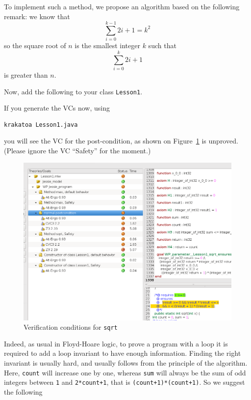 \documentclass[a4paper,11pt,twoside,openright]{report}
\begin{document}
To implement such a method, we propose an algorithm based on the
following remark: we know that
\[
\sum_{i=0}^{k-1} 2i+1 = k^2
\]
so the square root of $n$ is the smallest integer $k$ such that
\[
\sum_{i=0}^{k} 2i+1
\]
is greater than $n$.

Now, add the following to your class \texttt{Lesson1}.

If you generate the VCs now, using
\begin{verbatim}
krakatoa Lesson1.java
\end{verbatim}
you will see the VC for the post-condition, as shown on
Figure~\ref{fig:sqrt} is unproved. (Please ignore the VC ``Safety''
for the moment.)

\begin{figure}[t]
  \begin{center}
    \includegraphics[width=\textwidth]{Lesson1_isqrt_why3_1.png}
  \end{center}
  \caption{Verification conditions for \texttt{sqrt}}
\label{fig:sqrt}
\hrulefill
\end{figure}


Indeed, as usual in Floyd-Hoare logic, to prove a program with a loop
it is required to add a loop invariant to have enough
information.
Finding the right invariant is usually hard, and usually follows from the
principle of the algorithm. Here, \texttt{count} will increase one by
one, whereas \texttt{sum} will always be the sum of odd integers
between \texttt{1} and \texttt{2*count+1}, that is
\texttt{(count+1)*(count+1)}. So we suggest the following

\end{document}
